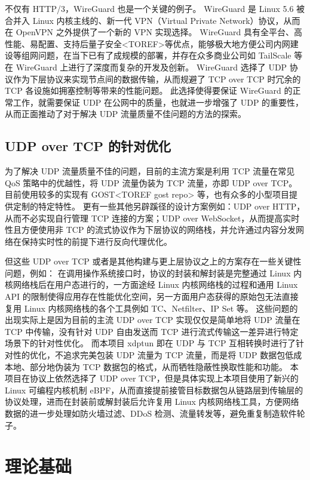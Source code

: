 不仅有 HTTP/3，WireGuard 也是一个关键的例子。
WireGuard 是 Linux 5.6 被合并入 Linux 内核主线的、新一代 VPN（Virtual Private Network）协议，从而在 OpenVPN 之外提供了一个新的 VPN 实现选择。
WireGuard 具有全平台、高性能、易配置、支持后量子安全<TOREF>等优点，能够极大地方便公司内网建设等组网问题，在当下已有了成规模的部署，并存在众多商业公司如 TailScale 等在 WireGuard 上进行了深度而复杂的开发及创新。
WireGuard 选择了 UDP 协议作为下层协议来实现节点间的数据传输，从而规避了 TCP over TCP 时冗余的 TCP 各设施如拥塞控制等带来的性能问题。
此选择使得要保证 WireGuard 的正常工作，就需要保证 UDP 在公网中的质量，也就进一步增强了 UDP 的重要性，从而正面推动了对于解决 UDP 流量质量不佳问题的方法的探索。

\section{UDP over TCP 的针对优化}

为了解决 UDP 流量质量不佳的问题，目前的主流方案是利用 TCP 流量在常见 QoS 策略中的优越性，将 UDP 流量伪装为 TCP 流量，亦即 UDP over TCP。
目前使用较多的实现有 GOST<TOREF gost repo> 等，也有众多的小型项目提供定制的特定特性。
更有一些其他另辟蹊径的设计方案例如：UDP over HTTP，从而不必实现自行管理 TCP 连接的方案；UDP over WebSocket，从而提高实时性且方便使用非 TCP 的流式协议作为下层协议的网络栈，并允许通过内容分发网络在保持实时性的前提下进行反向代理优化。

但这些 UDP over TCP 或者是其他构建与更上层协议之上的方案存在一些关键性问题，例如：
在调用操作系统接口时，协议的封装和解封装是完整通过 Linux 内核网络栈后在用户态进行的，一方面途经 Linux 内核网络栈的过程和通用 Linux API 的限制使得应用存在性能优化空间，另一方面用户态获得的原始包无法直接复用 Linux 内核网络栈的各个工具例如 TC、Netfilter、IP Set 等。
这些问题的出现实际上是因为目前的主流 UDP over TCP 实现仅仅是简单地将 UDP 流量在 TCP 中传输，没有针对 UDP 自由发送而 TCP 进行流式传输这一差异进行特定场景下的针对性优化。
而本项目 xdptun 即在 UDP 与 TCP 互相转换时进行了针对性的优化，不追求完美包装 UDP 流量为 TCP 流量，而是将 UDP 数据包低成本地、部分地伪装为 TCP 数据包的格式，从而牺牲隐蔽性换取性能和功能。
本项目在协议上依然选择了 UDP over TCP，但是具体实现上本项目使用了新兴的 Linux 可编程内核机制 eBPF，从而直接提前接管目标数据包从链路层到传输层的协议处理，进而在封装前或解封装后允许复用 Linux 内核网络栈工具，方便网络数据的进一步处理如防火墙过滤、DDoS 检测、流量转发等，避免重复制造软件轮子。

\chapter{理论基础}

